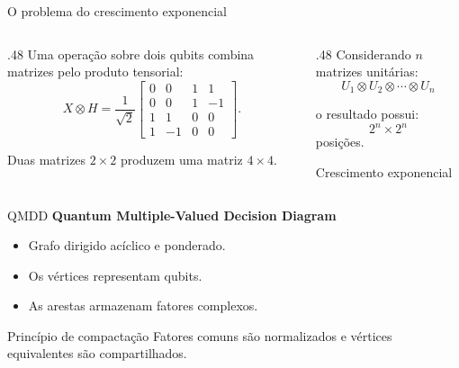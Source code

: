 \documentclass{beamer}
\begin{document}
\begin{frame}{O problema do crescimento exponencial}
  \begin{columns}[c]
    \begin{column}{.48\textwidth}
      Uma operação sobre dois qubits combina matrizes pelo produto tensorial:
      \[
        X\otimes H
        =\frac{1}{\sqrt{2}}
        \begin{bmatrix}
          0&0&1&1\\
          0&0&1&-1\\
          1&1&0&0\\
          1&-1&0&0
        \end{bmatrix}.
      \]

      Duas matrizes $2\times2$ produzem uma matriz $4\times4$.
    \end{column}

    \begin{column}{.48\textwidth}
      Considerando $n$ matrizes unitárias:
      \[
        U_1\otimes U_2\otimes\cdots\otimes U_n
      \]

      o resultado possui:
      \[
        2^n\times2^n
      \]
      posições.

      \begin{alertblock}{Crescimento exponencial}
      \end{alertblock}
    \end{column}
  \end{columns}
\end{frame}
\begin{frame}{QMDD}
  \textbf{Quantum Multiple-Valued Decision Diagram}

  \begin{itemize}
    \item Grafo dirigido acíclico e ponderado.
    \item Os vértices representam qubits.
    \item As arestas armazenam fatores complexos.
  \end{itemize}

  \begin{block}{Princípio de compactação}
    Fatores comuns são normalizados e vértices equivalentes são compartilhados.
  \end{block}
\end{frame}
\end{document}
